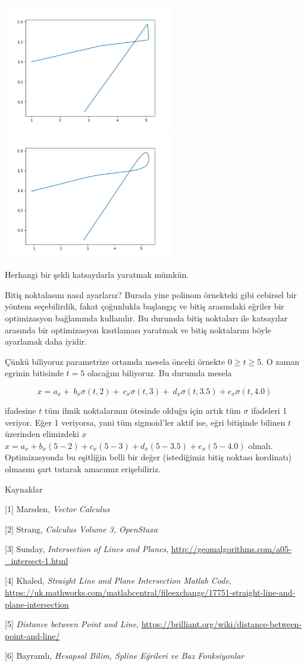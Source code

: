 \documentclass[12pt,fleqn]{article}\usepackage{../../common}
\begin{document}
\includegraphics[width=20em]{calc_multi_75_app_10.jpg}
\includegraphics[width=20em]{calc_multi_75_app_11.jpg}

Herhangi bir şekli katsayılarla yaratmak mümkün. 

Bitiş noktalasını nasıl ayarlarız? Burada yine polinom örnekteki gibi
cebirsel bir yöntem seçebilirdik, fakat çoğunlukla başlangıç ve bitiş
arasındaki eğriler bir optimizasyon bağlamında kullanılır. Bu durumda
bitiş noktaları ile katsayılar arasında bir optimizasyon kısıtlaması
yaratmak ve bitiş noktalarını böyle ayarlamak daha iyidir. 

Çünkü biliyoruz parametrize ortamda mesela önceki örnekte $0 \ge t \ge
5$. O zaman egrinin bitisinde $t=5$ olacağını biliyoruz. Bu durumda mesela 

$$
    x = a_x + \
        b_x \sigma(t,2) + \
        c_x \sigma(t,3) + \
        d_x \sigma(t,3.5) +
        e_x \sigma(t,4.0)
$$

ifadesine $t$ tüm ilmik noktalarının ötesinde olduğu için artık tüm
$\sigma$ ifadeleri 1 veriyor. Eğer 1 veriyorsa, yani tüm sigmoid'ler aktif
ise, eğri bitişinde bilinen $t$ üzerinden elimizdeki $x$ 
$x = a_x + b_x(5-2) + c_x(5-3) + d_x(5-3.5) + e_x(5-4.0)$
olmalı. Optimizasyonda bu eşitliğin belli bir değer (istediğimiz bitiş
noktası kordinatı) olmasını şart tutarak amacımız erişebiliriz.

Kaynaklar

[1] Marsden, {\em Vector Calculus}

[2] Strang, {\em Calculus Volume 3, OpenStaxa}

[3] Sunday, {\em Intersection of Lines and Planes}, 
\url{http://geomalgorithms.com/a05-_intersect-1.html}

[4] Khaled, {\em Straight Line and Plane Intersection Matlab Code}, 
\url{https://uk.mathworks.com/matlabcentral/fileexchange/17751-straight-line-and-plane-intersection}

[5] {\em Distance between Point and Line}, 
\url{https://brilliant.org/wiki/distance-between-point-and-line/}

[6] Bayramlı, {\em Hesapsal Bilim, Spline Eğrileri ve Baz Fonksiyonlar}
\end{document}
